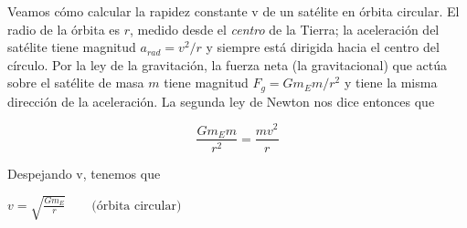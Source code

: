 \documentclass{article}
\newcommand{\definicion}[1]{%
    \vspace{0.5cm}
    \begin{definicionbox}
        #1
    \end{definicionbox}
    \vspace{0.5cm}
}
\begin{document}
    \par Veamos cómo calcular la rapidez constante v de un satélite en órbita circular. El radio de la órbita es $r$, medido desde el \textit{centro} de la Tierra; la aceleración del satélite tiene magnitud $a_{rad} = v^2/r$ y siempre está dirigida hacia el centro del círculo. Por la ley de la gravitación, la fuerza neta (la gravitacional) que actúa sobre el satélite de masa $m$ tiene magnitud $F_g = G m_E m / r^2$ y tiene la misma dirección de la aceleración. La segunda ley de Newton nos dice entonces que

    \[ \frac{G m_E m}{r^2} = \frac{m v^2}{r} \]

    \noindent Despejando v, tenemos que

    \definicion{
        \centering
        \( v = \sqrt{\frac{G m_E}{r}} \quad \quad \text{(órbita circular)} \)
    }
\end{document}

